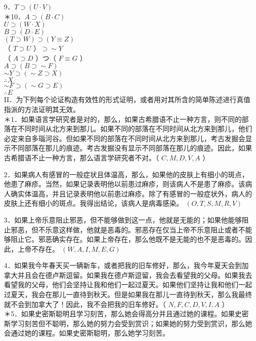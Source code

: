 9．$T \supset(U \cdot V)$\\
＊10．$A \supset(B \cdot C)$\\
$U \supset(W \cdot X)$\\
$B \supset(D \cdot E)$\\
$(T \supset W) \supset(Y \equiv Z)$\\
（ $T \supset U$ ）$\supset \sim Y$\\
（ $A \supset D$ ）つ（ $F \equiv G$ ）\\
$A \supset(B \supset \sim F)$\\
$\sim Y \supset(\sim Z \supset X)$\\
$\therefore X$\\
$\sim F \supset(\sim G \supset E)$\\
$\therefore E$\\
II．为下列每个论证构造有效性的形式证明，或者用对其所含的简单陈述进行真值指派的方法证明其无效。\\
＊1．如果语言学研究者是对的，那么，如果古希腊语不止一种方言，则不同的部落在不同时间从北方来到那儿。如果不同的部落在不同时间从北方来到那儿，他们必定来自多瑙河谷。但如果不同的部落在不同时间从北方来到那儿，考古发掘会显示不同部落在那儿的痕迹。考古发掘没有显示不同部落在那儿的痕迹。因此，如果古希腊语不止一种方言，那么语言学研究者不对。（ $C, M, D, V, A$ ）

2．如果病人有感冒的一般症状且体温高，那么，如果他的皮肤上有细小的斑点，他患了麻疹。当然，如果记录表明他以前患过麻疹，则该病人不是患了麻疹。该病人确实体温高，并且记录表明他以前患过麻疹。除了有感冒的一般症状外，病人的皮肤上还有细小的斑点。我得出结论，该病人是病毒感染。 $(O, T, S, M, R, V)$

3．如果上帝乐意阻止邪恶，但不能够做到这一点，他就是无能的；如果他能够阻止邪恶，但不乐意这样做，他就是恶毒的。邪恶存在仅当上帝不乐意阻止或者不能够阻止它。邪恶确实存在。如果上帝存在，那么他既不是无能的也不是恶毒的。因此，上帝不存在。 $(W, A, I, M, E, G)$

4．如果我今年春天买一辆新车，或者把我的旧车修好，那么，我今年夏天会到加拿大并且会在德卢斯逗留。如果我在德卢斯逗留，我会去看望我的父母。如果我去看望我的父母，他们会坚持让我和他们一起过夏天。如果他们坚持让我和他们一起过夏天，我会在那儿一直待到秋天。但是如果我在那儿一直待到秋天，那么我最终就不会到加拿大了！因此，我不会把我的旧车修好。（ $N, F, C, D, V, I, A$ ）\\
＊5．如果史密斯聪明且学习刻苦，那么她会得高分并且通过她的课程。如果史密斯学习刻苦但不聪明，那么她的努力会受到赏识；如果她的努力受到赏识，那么她会通过她的课程。如果史密斯聪明，那么她学习刻苦。

